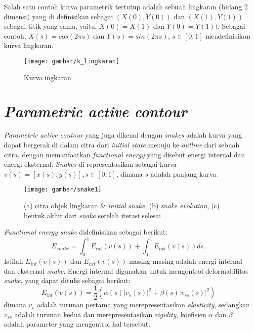 Salah satu contoh kurva parametrik tertutup adalah sebuah lingkaran (bidang 2 dimensi) yang di definisikan sebagai $(X(0), Y(0))$ dan $(X(1), Y(1))$ sebagai titik yang sama, yaitu, $X(0) = X(1)$ dan $Y(0) = Y(1))$. Sebagai contoh, $X (s) = cos (2 \pi s)$ dan $Y (s) = sin (2 \pi s)$,  $s \in [0, 1] $ mendefinisikan kurva lingkaran\cite{acton2007biomedical:19}.
\begin{figure}[H]
	\centering
	\texttt{[image: gambar/k\_lingkaran]}
	\caption{Kurva ingkaran}
	\label{Gambar:k_lingkaran}
\end{figure}


\section{\emph{Parametric active contour}}
\emph{Parametric active contour} yang juga dikenal dengan \emph{snakes} adalah kurva yang dapat bergerak di dalam citra dari \emph{initial state} menuju ke \emph{outline} dari sebuah citra, dengan memanfaatkan \emph{functional energy} yang disebut energi internal dan energi eksternal. \emph{Snakes} di representasikan sebagai kurva $v(s) = [x(s), y(s)], s \in [0,1]$, dimana $s$ adalah panjang kurva\citep{abdullah2016robust}.
\begin{figure}[H]
	\centering
	\texttt{[image: gambar/snake1]}
	\caption{(a) citra objek lingkaran \& \emph{initial snake}, (b) \emph{snake evolution},
		(c) bentuk akhir dari \emph{snake} setelah iterasi selesai \citep{acton2007biomedical:19}}
	\label{Gambar:snake1}
\end{figure}

\emph{Functional energy snake} didefinisikan sebagai berikut:
\begin{equation}
\label{eq_1}
E_{snake} = \int^1_0 E_{int}(v(s)) + \int^1_0 E_{ext}(v(s)) ds.
\end{equation}
Istilah $E_{int}(v(s))$ dan $E_{ext}(v(s))$ masing-masing adalah energi internal dan eksternal \emph{snake}. Energi internal digunakan untuk mengontrol deformabilitas \emph{snake}, yang dapat ditulis sebagai berikut:
\begin{equation}
\label{eq_2}
E_{int}(v(s)) = \frac{1}{2} \left(\alpha(s)|v_{s}(s)|^2 + \beta(s)|v_{ss}(s)|^2\right)
\end{equation}
dimana $v_{s}$ adalah turunan pertama yang merepresentasikan \emph{elasticity}, sedangkan $v_{ss}$ adalah turunan kedua dan merepresentasikan \emph{rigidity}, koefisien $\alpha$ dan $\beta$ adalah parameter yang mengontrol hal tersebut\citep{abdullah2016robust}.

